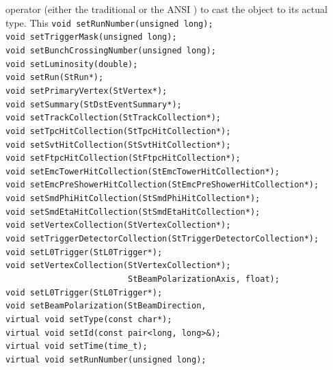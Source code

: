\begin{enumerate}
\begin{Entry}
    operator (either the traditional \name{()} or the ANSI
    ) to cast the object to its actual type. This
    \verb+void setRunNumber(unsigned long);+\\                
    \verb+void setTriggerMask(unsigned long);+\\              
    \verb+void setBunchCrossingNumber(unsigned long);+\\      
    \verb+void setLuminosity(double);+\\               
    \verb+void setRun(StRun*);+\\                            
    \verb+void setPrimaryVertex(StVertex*);+\\                  
    \verb+void setSummary(StDstEventSummary*);+\\                        
    \verb+void setTrackCollection(StTrackCollection*);+\\                
    \verb+void setTpcHitCollection(StTpcHitCollection*);+\\               
    \verb+void setSvtHitCollection(StSvtHitCollection*);+\\               
    \verb+void setFtpcHitCollection(StFtpcHitCollection*);+\\              
    \verb+void setEmcTowerHitCollection(StEmcTowerHitCollection*);+\\              
    \verb+void setEmcPreShowerHitCollection(StEmcPreShowerHitCollection*);+\\              
    \verb+void setSmdPhiHitCollection(StSmdPhiHitCollection*);+\\              
    \verb+void setSmdEtaHitCollection(StSmdEtaHitCollection*);+\\              
    \verb+void setVertexCollection(StVertexCollection*);+\\               
    \verb+void setTriggerDetectorCollection(StTriggerDetectorCollection*);+\\      
    \verb+void setL0Trigger(StL0Trigger*);+\\                      
    \verb+void setVertexCollection(StVertexCollection*);+\\
    \verb+                         StBeamPolarizationAxis, float);+\\                   
    \verb+void setL0Trigger(StL0Trigger*);+\\
    \verb+void setBeamPolarization(StBeamDirection, +\\
    \verb+virtual void setType(const char*);+\\
    \verb+virtual void setId(const pair<long, long>&);+\\
    \verb+virtual void setTime(time_t);+\\
    \verb+virtual void setRunNumber(unsigned long);+\\
    

\end{Entry}
\end{enumerate}
